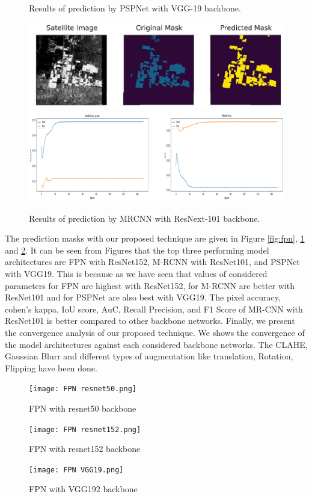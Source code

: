 \documentclass[a4paper,12pt]{spieman}  %
\begin{document}
\begin{spacing}{1}
\begin{figure}[!htbp]
 \caption{\label{fig:psp}Results of prediction by PSPNet with VGG-19 backbone.}
\end{figure}
\begin{figure}[!htbp]
	\centering
	\includegraphics[width=\textwidth]{mrcnn.PNG}
 \includegraphics[width=\textwidth]{mrcnn-resnet101.png}
	\caption{\label{fig:mrcnn}Results of prediction by MRCNN with ResNext-101 backbone.}
\end{figure}
The prediction masks with our proposed technique are given in Figure \ref{fig:fpn}, \ref{fig:psp} and \ref{fig:mrcnn}. It can be seen from Figures that the top three performing model architectures are FPN with ResNet152, M-RCNN with ResNet101, and PSPNet with VGG19. This is because as we have seen that values of considered parameters for FPN are highest with ResNet152, for M-RCNN are better with ResNet101 and for PSPNet are also best with VGG19. 
The pixel accuracy, cohen’s kappa, IoU score, AuC, Recall Precision, and F1 Score of MR-CNN with ResNet101 is better compared to other backbone networks.
Finally, we present the convergence analysis of our proposed technique. We shows the convergence of the model architectures against each considered backbone networks. The CLAHE, Gaussian Blurr and different types of augmentation like translation, Rotation, Flipping have been done. 
\begin{figure}[!htbp]
	\centering
	\texttt{[image: FPN resnet50.png]}
     \caption{FPN with resnet50 backbone}
 \texttt{[image: FPN resnet152.png]}
 \caption{FPN with resnet152 backbone}
 \texttt{[image: FPN VGG19.png]}
 \caption{FPN with VGG192 backbone}
 \end{figure}

\end{spacing}
\end{document}

